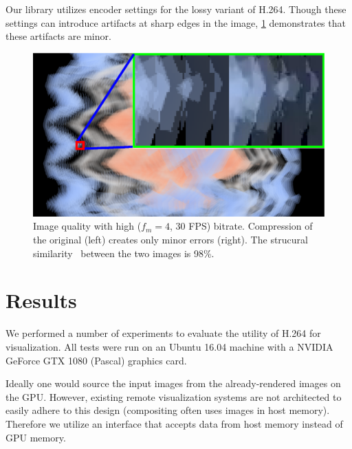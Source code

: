 \documentclass[review]{vgtc}                 %
\begin{document}
Our library utilizes encoder settings for the lossy variant of
H.264. Though these settings can introduce artifacts at sharp edges in
the image, \cref{fig:quality} demonstrates that these artifacts are minor.

\begin{figure}[h]
  \centering
  \includegraphics[width=\columnwidth]{quality.eps}
  \caption{Image quality with high ($f_m=4$, 30 FPS) bitrate.
  Compression of the original (left) creates only minor errors (right).
  The strucural similarity~\cite{wang2004image} between the two images is
  98\%.}
  \label{fig:quality}
\end{figure}

\section{Results}


We performed a number of experiments to evaluate the utility of H.264
for visualization. All tests were run on an Ubuntu 16.04 machine with a
NVIDIA GeForce GTX 1080 (Pascal) graphics card.


Ideally one would source the input images from the already-rendered
images on the GPU. However, existing remote visualization systems are
not architected to easily adhere to this design (compositing often uses
images in host memory). Therefore we utilize an interface that accepts
data from host memory instead of GPU memory.
\end{document}
